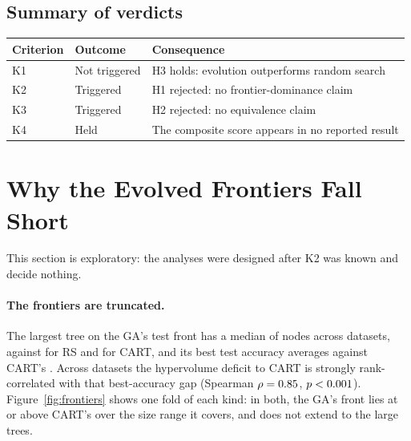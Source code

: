 \documentclass[11pt]{article}
\newcommand{\GA}{GA\xspace}
\newcommand{\RS}{RS\xspace}
\begin{document}
\begin{table}[t]
  \centering
  \caption{Point-estimate run, per dataset: mean test accuracy of the tuned \GA{} and
  tuned CART, their difference with a 90\% Nadeau--Bengio interval, mean leaf counts, and
  whether the dataset counts against the \GA under K3's primary reading.}
  \label{tab:k3}
  \small
  
\end{table}

\subsection{Summary of verdicts}
\begin{center}
\small
\begin{tabular}{lll}
\toprule
Criterion & Outcome & Consequence \\
\midrule
K1 & Not triggered & H3 holds: evolution outperforms random search \\
K2 & Triggered & H1 rejected: no frontier-dominance claim \\
K3 & Triggered & H2 rejected: no equivalence claim \\
K4 & Held & The composite score appears in no reported result \\
\bottomrule
\end{tabular}
\end{center}

\section{Why the Evolved Frontiers Fall Short}
\label{sec:mechanism}

This section is exploratory: the analyses were designed after K2 was known and decide
nothing.

\paragraph{The frontiers are truncated.} The largest tree on the \GA's test front has a
median of \MedianMaxNodesGA{} nodes across datasets, against \MedianMaxNodesRS{} for \RS{}
and \MedianMaxNodesCart{} for CART, and its best test accuracy averages \BestAccGA{} against
CART's \BestAccCart. Across datasets the hypervolume deficit to CART is strongly
rank-correlated with that best-accuracy gap (Spearman $\rho=0.85$,
$p<0.001$). Figure~\ref{fig:frontiers} shows one fold of each kind: in both, the
\GA's front lies at or above CART's over the size range it covers, and does not extend to
the large trees.
\end{document}
